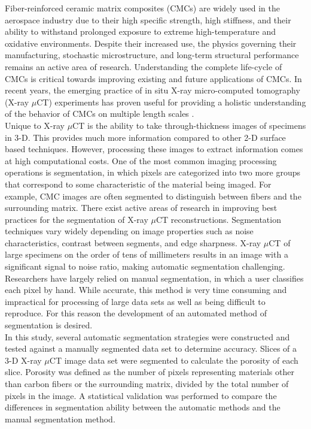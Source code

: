 \documentclass[11pt, twocolumn]{article}
\begin{document}
Fiber-reinforced ceramic matrix composites (CMCs) are widely used in the aerospace industry due to their high specific strength, high stiffness, and their ability to withstand prolonged exposure to extreme high-temperature and oxidative environments. Despite their increased use, the physics governing their manufacturing, stochastic microstructure, and long-term structural performance remains an active area of research. Understanding the complete life-cycle of CMCs is critical towards improving  existing and future applications of CMCs. In recent years, the emerging practice of in situ X-ray micro-computed tomography (X-ray $\mu$CT) experiments has proven useful for providing a holistic understanding of the behavior of CMCs on multiple length scales \cite{Larson,Bale,Bale2,Cox,Haboub,Marshall}.\\
Unique to X-ray $\mu$CT is the ability to take through-thickness images of specimens in 3-D. This provides much more information compared to other 2-D surface based techniques. However, processing these images to extract information comes at high computational costs. One of the most common imaging processing operations is segmentation, in which pixels are categorized into two more groups that correspond to some characteristic of the material being imaged. For example, CMC images are often segmented to distinguish between fibers and the surrounding matrix. There exist active areas of research in improving best practices for the segmentation of X-ray $\mu$CT reconstructions. Segmentation techniques vary widely depending on image properties such as noise characteristics, contrast between segments, and edge sharpness. X-ray $\mu$CT of large specimens on the order of tens of millimeters results in an image with a significant signal to noise ratio, making automatic segmentation challenging. Researchers have largely relied on manual segmentation, in which a user classifies each pixel by hand. While accurate, this method is very time consuming and impractical for processing of large data sets as well as being difficult to reproduce. For this reason the development of an automated method of segmentation is desired.\\
In this study, several automatic segmentation strategies were constructed and tested against a manually segmented data set to determine accuracy. Slices of a 3-D X-ray $\mu$CT image data set were segmented to calculate the porosity of each slice. Porosity was defined as the number of pixels representing materials other than carbon fibers or the surrounding matrix, divided by the total number of pixels in the image. A statistical validation was performed to compare the differences in segmentation ability between the automatic methods and the manual segmentation method.
\end{document}
